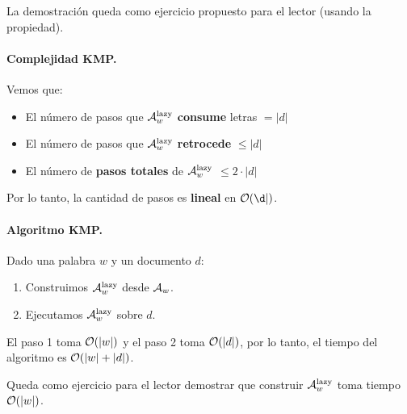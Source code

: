 La demostración queda como ejercicio propuesto para el lector (usando la propiedad).

\paragraph{Complejidad KMP.} Vemos que:
\begin{itemize}
    \item El número de pasos que $\mathcal{A}_w^\text{lazy}$ \textbf{consume} letras $= |d|$
    \item El número de pasos que $\mathcal{A}_w^\text{lazy}$ \textbf{retrocede} $\leq |d|$
    \item El número de \textbf{pasos totales} de $\mathcal{A}_w^\text{lazy}$ $\leq 2 \cdot |d|$
\end{itemize}
Por lo tanto, la cantidad de pasos es \textbf{lineal} en $\ca{O}(\d|)$.

\paragraph{Algoritmo KMP.} Dado una palabra $w$ y un documento $d$:
\begin{enumerate}
    \item Construimos $\mathcal{A}_w^\text{lazy}$ desde $\mathcal{A}_w$.
    \item Ejecutamos $\mathcal{A}_w^\text{lazy}$ sobre $d$.
\end{enumerate}

El paso 1 toma $\mathcal{O}(|w|)$ y el paso 2 toma $\mathcal{O}(|d|)$, por lo tanto, el tiempo del algoritmo es $\mathcal{O}(|w| + |d|)$. \medbreak

Queda como ejercicio para el lector demostrar que construir $\mathcal{A}_w^\text{lazy}$ toma tiempo $\mathcal{O}(|w|)$.




